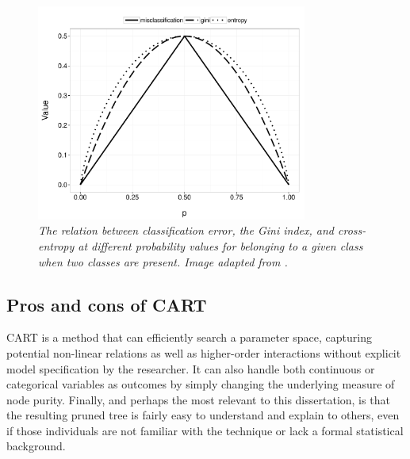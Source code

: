 \begin{figure}[h]
  \centering
  \includegraphics[width=3.5in]{Figures/Chapter02/compare_cat_long.pdf}
  \caption[The relation between classification error, the Gini index, and cross-entropy.]{\textit{The relation between classification error, the Gini index, and cross-entropy at different probability values for belonging to a given class when two classes are present. Image adapted from \cite{hastie2009elements}.}}
  \label{fig:compare_cat}
\end{figure}




\subsection{Pros and cons of CART}


	CART is a method that can efficiently search a parameter space, capturing potential non-linear relations as well as higher-order interactions without explicit model specification by the researcher. It can also handle both continuous or categorical variables as outcomes by simply changing the underlying measure of node purity. Finally, and perhaps the most relevant to this dissertation, is that the resulting pruned tree is fairly easy to understand and explain to others, even if those individuals are not familiar with the technique or lack a formal statistical background.


